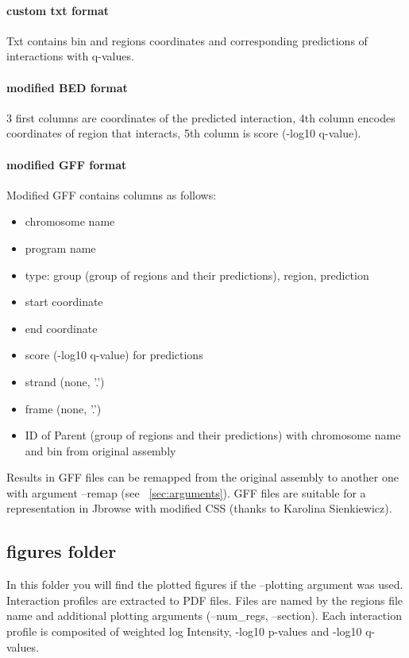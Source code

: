 \paragraph{custom txt format}
Txt contains bin and regions coordinates and corresponding predictions of interactions with q-values.
\paragraph{modified BED format}
3 first columns are coordinates of the predicted interaction, 4th column encodes coordinates of region that interacts,
5th column is score (-log10 q-value).
\paragraph{modified GFF format}
Modified GFF contains columns as follows:
\begin{itemize}
    \item chromosome name
    \item program name
    \item type: group (group of regions and their predictions), region, prediction
    \item start coordinate
    \item end coordinate
    \item score (-log10 q-value) for predictions
    \item strand (none, '.')
    \item frame (none, '.')
    \item ID of Parent (group of regions and their predictions) with chromosome name and bin from original assembly
\end{itemize}

Results in GFF files can be remapped from the original assembly to another one with argument --remap (see ~\ref{sec:arguments}).
GFF files are suitable for a representation in Jbrowse with modified CSS (thanks to Karolina Sienkiewicz).

\subsection{figures folder}
In this folder you will find the plotted figures if the --plotting argument was used. Interaction profiles are
extracted to PDF files. Files are named by the regions file name and additional plotting arguments (--num\_regs,
--section). Each interaction profile is composited of weighted log Intensity, -log10 p-values and -log10 q-values.

